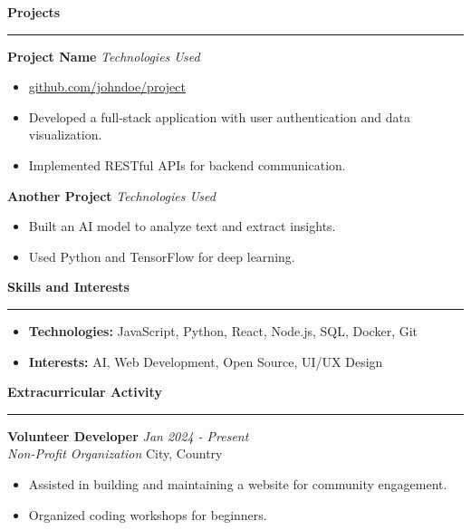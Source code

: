 \documentclass[10pt]{article}
\newcommand{\cvsection}[1]{
    \vspace{0.1cm}
    \noindent
    \textbf{\large #1}
    \vspace{0.1cm}
    \hrule
    \vspace{0.2cm}
}
\newcommand{\cvitem}[4]{
    \noindent
    \textbf{#1} \hfill \textit{#2} \\
    \textit{#3} \hfill #4
}
\newcommand{\cvproject}[3]{
    \noindent
    \textbf{#1} \hfill \textit{#2} \\
    \begin{minipage}[t]{\linewidth}
    #3
    \end{minipage}
}
\begin{document}
\cvsection{Projects}
\cvproject{Project Name}{Technologies Used}{%
\begin{itemize}[leftmargin=*, nosep]
    \item[] \faGithub \hspace{0.1cm} \href{https://github.com/johndoe/project}{github.com/johndoe/project}
    \item Developed a full-stack application with user authentication and data visualization.
    \item Implemented RESTful APIs for backend communication.
\end{itemize}
}

\cvproject{Another Project}{Technologies Used}{%
\begin{itemize}[leftmargin=*, nosep]
    \item Built an AI model to analyze text and extract insights.
    \item Used Python and TensorFlow for deep learning.
\end{itemize}
}

\cvsection{Skills and Interests}
\begin{itemize}[leftmargin=*, nosep]
    \item \textbf{Technologies:} {JavaScript, Python, React, Node.js, SQL, Docker, Git}
    \item \textbf{Interests:} {AI, Web Development, Open Source, UI/UX Design}
\end{itemize}

\cvsection{Extracurricular Activity}
\cvitem{Volunteer Developer}{Jan 2024 - Present}{Non-Profit Organization}{City, Country}
\begin{itemize}[leftmargin=*, nosep]
    \item Assisted in building and maintaining a website for community engagement.
    \item Organized coding workshops for beginners.
\end{itemize}
\end{document}
